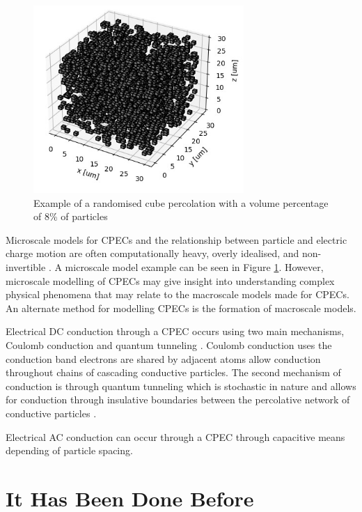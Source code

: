 \begin{figure}[H]
    \centering
    \includegraphics[width=8cm]{Figures/simple_random_percolation.jpg}
    \caption{Example of a randomised cube percolation with a volume percentage of 8\% of particles}
    \label{fig:simp_rand_perc}
\end{figure}

Microscale models for CPECs and the relationship between particle and electric charge motion are often computationally heavy, overly idealised, and non-invertible \cite{Wang2022}. A microscale model example can be seen in Figure \ref{fig:simp_rand_perc}. However, microscale modelling of CPECs may give insight into understanding complex physical phenomena that may relate to the macroscale models made for CPECs. An alternate method for modelling CPECs is the formation of macroscale models\cite{Neffati2019}.

Electrical DC conduction through a CPEC occurs using two main mechanisms, Coulomb conduction and quantum tunneling \cite{Bloor2006,Duan2014,Zhang2007,Madrid2017}. Coulomb conduction uses the conduction band electrons are shared by adjacent atoms allow conduction throughout chains of cascading conductive particles. The second mechanism of conduction is through quantum tunneling which is stochastic in nature and allows for conduction through insulative boundaries between the percolative network of conductive particles \cite{Hu2008,Grimaldi2006}. 

Electrical AC conduction can occur through a CPEC through capacitive means depending of particle spacing\cite{??}.



\section{It Has Been Done Before}
\label{sec:It Has Been Done Before}


